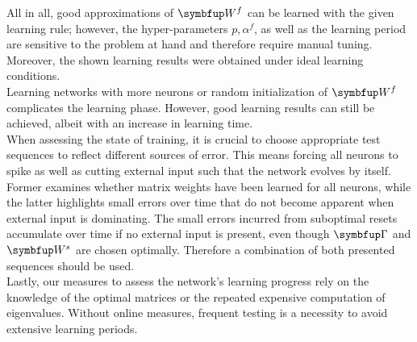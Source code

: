 All in all, good approximations of $\bmu{W}^f$ can be learned with the given learning rule; however, the hyper-parameters $p,\alpha^f$, as well as the learning period are sensitive to the problem at hand and therefore require manual tuning. Moreover, the shown learning results were obtained under ideal learning conditions.\\
Learning networks with more neurons or random initialization of $\bmu{W}^f$ complicates the learning phase. However, good learning results can still be achieved, albeit with an increase in learning time.\\
When assessing the state of training, it is crucial to choose appropriate test sequences to reflect different sources of error. This means forcing all neurons to spike as well as cutting external input such that the network evolves by itself. Former examines whether matrix weights have been learned for all neurons, while the latter highlights small errors over time that do not become apparent when external input is dominating. The small errors incurred from suboptimal resets accumulate over time if no external input is present, even though $\bmu{\Gamma}$ and $\bmu{W}^s$ are chosen optimally. Therefore a combination of both presented sequences should be used.\\
Lastly, our measures to assess the network's learning progress rely on the knowledge of the optimal matrices or the repeated expensive computation of eigenvalues. Without online measures, frequent testing is a necessity to avoid extensive learning periods.\\
